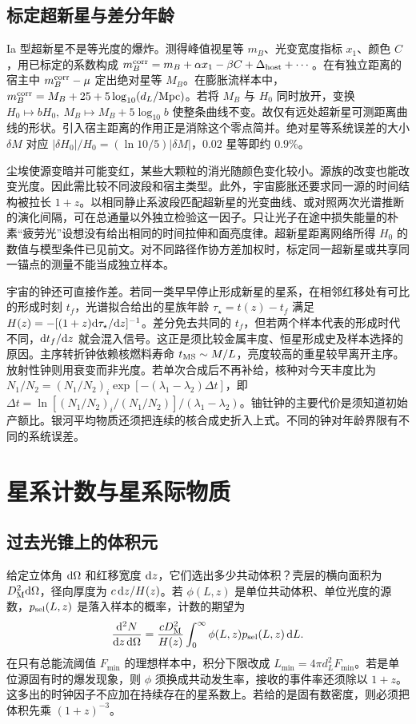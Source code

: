 \subsection{标定超新星与差分年龄}

Ia 型超新星不是等光度的爆炸。测得峰值视星等 $m_B$、光变宽度指标 $x_1$、颜色 $C$，用已标定的系数构成 $m_B^{\rm corr}=m_B+\alpha x_1-\beta C+\Delta_{\rm host}+\cdots$。在有独立距离的宿主中 $m_B^{\rm corr}-\mu$ 定出绝对星等 $M_B$。在膨胀流样本中，$m_B^{\rm corr}=M_B+25+5\log_{10}(d_L/{\rm Mpc})$。若将 $M_B$ 与 $H_0$ 同时放开，变换 $H_0\mapsto bH_0,\ M_B\mapsto M_B+5\log_{10}b$ 使整条曲线不变。故仅有远处超新星可测距离曲线的形状。引入宿主距离的作用正是消除这个零点简并。绝对星等系统误差的大小 $\delta M$ 对应 $|\delta H_0|/H_0=(\ln10/5)|\delta M|$，$0.02$ 星等即约 $0.9\%$。

尘埃使源变暗并可能变红，某些大颗粒的消光随颜色变化较小。源族的改变也能改变光度。因此需比较不同波段和宿主类型。此外，宇宙膨胀还要求同一源的时间结构被拉长 $1+z$。以相同静止系波段匹配超新星的光变曲线、或对照两次光谱推断的演化间隔，可在总通量以外独立检验这一因子。只让光子在途中损失能量的朴素“疲劳光”设想没有给出相同的时间拉伸和面亮度律。超新星距离网络所得 $H_0$ 的数值与模型条件已见前文。对不同路径作协方差加权时，标定同一超新星或共享同一锚点的测量不能当成独立样本。

宇宙的钟还可直接作差。若同一类早早停止形成新星的星系，在相邻红移处有可比的形成时刻 $t_f$，光谱拟合给出的星族年龄 $\tau_\star=t(z)-t_f$ 满足 $H(z)=-[(1+z)\dd\tau_\star/\dd z]^{-1}$。差分免去共同的 $t_f$，但若两个样本代表的形成时代不同，$\dd t_f/\dd z$ 就会混入信号。这正是须比较金属丰度、恒星形成史及样本选择的原因。主序转折钟依赖核燃料寿命 $t_{\rm MS}\sim M/L$，亮度较高的重星较早离开主序。放射性钟则用衰变而非光度。若单次合成后不再补给，核种对今天丰度比为 $N_1/N_2=(N_1/N_2)_i\exp[-(\lambda_1-\lambda_2)\Delta t]$，即 $\Delta t=\ln[(N_1/N_2)_i/(N_1/N_2)]/(\lambda_1-\lambda_2)$。铀钍钟的主要代价是须知道初始产额比。银河平均物质还须把连续的核合成史折入上式。不同的钟对年龄界限有不同的系统误差。

\section{星系计数与星系际物质}\label{sec:cosmo-surveys}

\subsection{过去光锥上的体积元}

给定立体角 $\dd\Omega$ 和红移宽度 $\dd z$，它们选出多少共动体积？壳层的横向面积为 $D_{\rm M}^2\dd\Omega$，径向厚度为 $c\,\dd z/H(z)$。若 $\phi(L,z)$ 是单位共动体积、单位光度的源数，$p_{\rm sel}(L,z)$ 是落入样本的概率，计数的期望为
\begin{equation}\label{eq:cosmo-sourcecounts}
 \frac{\dd^2N}{\dd z\,\dd\Omega}
 =\frac{cD_{\rm M}^2}{H(z)}
    \int_0^\infty \phi(L,z)p_{\rm sel}(L,z)\,\dd L .
\end{equation}
在只有总能流阈值 $F_{\min}$ 的理想样本中，积分下限改成 $L_{\min}=4\pi d_L^2 F_{\min}$。若是单位源固有时的爆发现象，则 $\phi$ 须换成共动发生率，接收的事件率还须除以 $1+z$。这多出的时钟因子不应加在持续存在的星系数上。若给的是固有数密度，则必须把体积先乘 $(1+z)^{-3}$。

